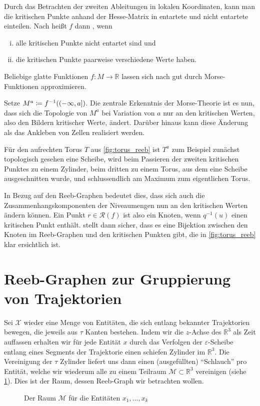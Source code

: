 Durch das Betrachten der zweiten Ableitungen in lokalen Koordinaten, kann man die kritischen Punkte anhand der Hesse-Matrix in entartete und nicht entartete einteilen. 
Nach \textcite{compTopo} heißt $f$ dann , wenn 
\begin{enumerate}[(i)]
	\item alle kritischen Punkte nicht entartet sind und
	\item\label{enum:def:morse:2} die kritischen Punkte paarweise verschiedene Werte haben. 
\end{enumerate}
Beliebige glatte Funktionen $f \colon M \to \mathbb{R}$ lassen sich nach \textcite[Corr.~6.8]{MilnorMorse} gut durch Morse-Funktionen approximieren.

Setze $M^a \coloneqq f^{-1}\enbrace*{(-\infty,a]}$.
Die zentrale Erkenntnis der Morse-Theorie ist es nun, dass sich die Topologie von $M^a$ bei Variation von $a$ nur an den kritischen Werten, also den Bildern kritischer Werte, ändert.
Darüber hinaus kann diese Änderung als das Ankleben von Zellen realisiert werden.

Für den aufrechten Torus $T$ aus \cref{fig:torus_reeb} ist $T^a$ zum Beispiel zunächst topologisch gesehen eine Scheibe, wird beim Passieren der zweiten kritischen Punktes zu einem Zylinder, beim dritten zu einem Torus, aus dem eine Scheibe ausgeschnitten wurde, und schlussendlich am Maximum zum eigentlichen Torus.

In Bezug auf den Reeb-Graphen bedeutet dies, dass sich auch die Zusammenhangskomponenten der Niveaumengen nun an den kritischen Werten ändern können.
Ein Punkt $r \in \mathcal{R}(f)$ ist also ein Knoten, wenn $q^{-1}(u)$ einen kritischen Punkt enthält.
 stellt dann sicher, dass es eine Bijektion zwischen den Knoten im Reeb-Graphen und den kritischen Punkten gibt, die in \cref{fig:torus_reeb} klar ersichtlich ist.




\section{Reeb-Graphen zur Gruppierung von Trajektorien} %
\label{sec:trajek_reeb}
Sei $\mathcal{X}$ wieder eine Menge von Entitäten, die sich entlang bekannter Trajektorien bewegen, die jeweils aus $\tau$ Kanten bestehen.
Indem wir die $z$-Achse des $\mathbb{R}^3$ als Zeit auffassen erhalten wir für jede Entität $x$ durch das Verfolgen der $\varepsilon$-Scheibe entlang eines Segments der Trajektorie einen schiefen Zylinder im $\mathbb{R}^3$.
Die Vereinigung der $\tau$ Zylinder liefert uns dann einen (ausgefüllten) \enquote{Schlauch} pro Entität, welche wir wiederum alle zu einem Teilraum $\mathcal{M} \subset \mathbb{R}^3$ vereinigen (siehe \cref{fig:tubes}).
Dies ist der Raum, dessen Reeb-Graph wir betrachten wollen.

\begin{figure}[htbp]
	\Centering
	\caption{Der Raum $\mathcal{M}$ für die Entitäten $x_1, \ldots ,x_k$}\label{fig:tubes}
\end{figure}


